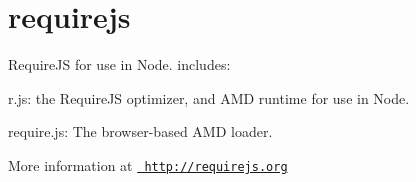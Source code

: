 \chapter{requirejs}
\hypertarget{md__c_1_2_users_2_s_t_r_i_d_e_r_2source_2repos_2_internal_a_p_i_2_internal_a_p_i_2wwwroot_2lib_2cb6ee22b6fec92b84fa978f1f5dea027}{}\label{md__c_1_2_users_2_s_t_r_i_d_e_r_2source_2repos_2_internal_a_p_i_2_internal_a_p_i_2wwwroot_2lib_2cb6ee22b6fec92b84fa978f1f5dea027}
\label{md__c_1_2_users_2_s_t_r_i_d_e_r_2source_2repos_2_internal_a_p_i_2_internal_a_p_i_2wwwroot_2lib_2cb6ee22b6fec92b84fa978f1f5dea027_autotoc_md11185}%
%
 Require\+JS for use in Node. includes\+:


\begin{DoxyItemize}
\item r.\+js\+: the Require\+JS optimizer, and AMD runtime for use in Node.
\item require.\+js\+: The browser-\/based AMD loader.
\end{DoxyItemize}

More information at \href{http://requirejs.org}{\texttt{ http\+://requirejs.\+org}} 